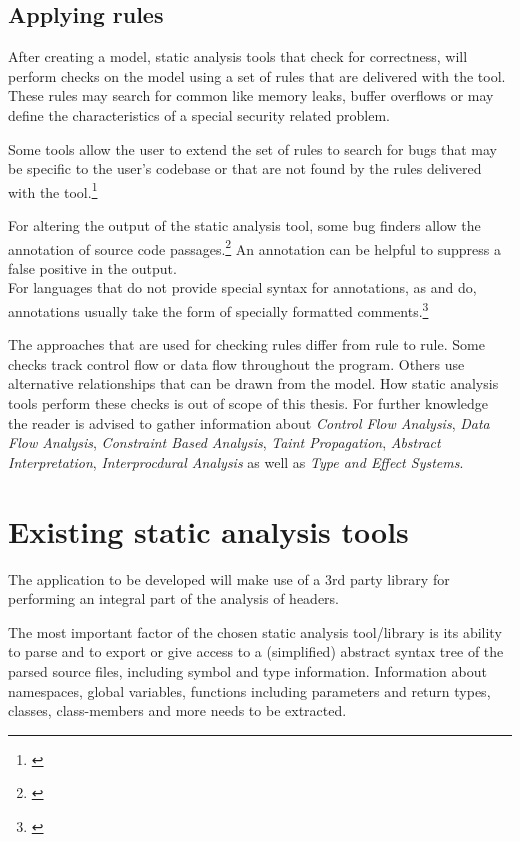 \subsection{Applying rules}

After creating a model, static analysis tools that check for correctness, will perform checks on the model using a set of rules that are delivered with the tool. These rules may search for common  like memory leaks, buffer overflows or may define the characteristics of a special security related problem.

Some tools allow the user to extend the set of rules to search for bugs that may be specific to the user's codebase or that are not found by the rules delivered with the tool.\footnote{\citep[97]{SecureProgramming}}

For altering the output of the static analysis tool, some bug finders allow the annotation of source code passages.\footnote{\citep[99]{SecureProgramming}} An annotation can be helpful to suppress a false positive in the output.
\\For languages that do not provide special syntax for annotations, as  and  do, annotations usually
take the form of specially formatted comments.\footnote{\citep[99]{SecureProgramming}}

The approaches that are used for checking rules differ from rule to rule. Some checks track control flow or data flow throughout the program. Others use alternative relationships that can be drawn from the model. How static analysis tools perform these checks is out of scope of this thesis. For further knowledge the reader is advised to gather information about \textit{Control Flow Analysis}, \textit{Data Flow Analysis}, \textit{Constraint Based Analysis}, \textit{Taint Propagation}, \textit{Abstract Interpretation}, \textit{Interprocdural Analysis }as well as \textit{Type and Effect Systems}. 

\section{Existing static analysis tools}

The application to be developed will make use of a 3rd party library for performing an integral part of the analysis of  headers. 

The most important factor of the chosen static analysis tool/library is its ability to parse  and to export or give access to a (simplified) abstract syntax tree of the parsed source files, including symbol and type information. Information about namespaces, global variables, functions including parameters and return types, classes, class-members and more needs to be extracted.

